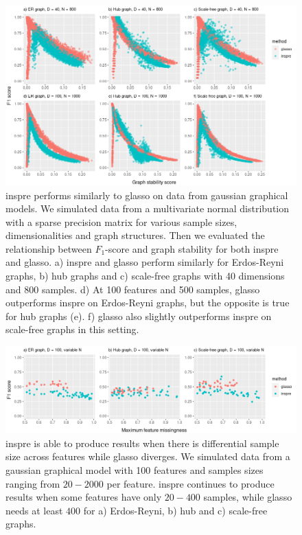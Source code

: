 \documentclass{article}
\begin{document}
\newpage
\begin{figure}[H]\label{figureS1}
\includegraphics[width=\textwidth]{figures/figure_S1.png}
\caption{inspre performs similarly to glasso on data from gaussian graphical models.
We simulated data from a multivariate normal distribution with a sparse precision matrix
for various sample sizes, dimensionalities and graph structures. Then we evaluated the
relationship between $F_1$-score and graph stability for both inspre and glasso. a) inspre
and glasso perform similarly for Erdos-Reyni graphs, b) hub graphs and c) scale-free graphs
with 40 dimensions and 800 samples. d) At 100 features and 500 samples,
glasso outperforms inspre on Erdos-Reyni graphs,
but the opposite is true for hub graphs (e). f)
glasso also slightly outperforms inspre on scale-free graphs in this setting.}
\end{figure}

\newpage
\begin{figure}[H]\label{figureS2}
\includegraphics[width=\textwidth]{figures/figure_S2.png}
\caption{inspre is able to produce results when there is differential sample size across
features while glasso diverges. We simulated data from a gaussian graphical model with 100
features and samples sizes ranging from $20-2000$ per feature. inspre continues to produce
results when some features have only $20-400$ samples, while glasso needs at least $400$
for a) Erdos-Reyni, b) hub and c) scale-free graphs.}
\end{figure}
\end{document}
